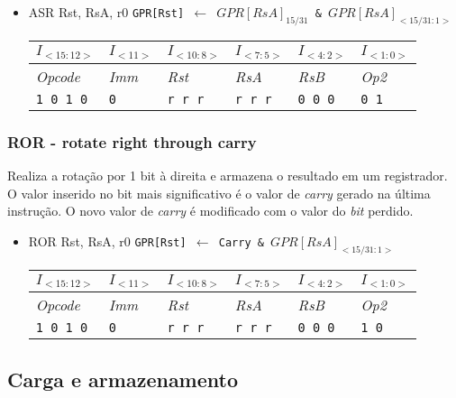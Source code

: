 \documentclass{extreport}
\begin{document}
\begin{itemize}
\item ASR Rst, RsA, r0
\subitem \texttt{GPR[Rst] $\leftarrow$ $GPR[RsA]_{15/31}$ \& $GPR[RsA]_{<15/31:1>}$}
\begin{table}[ht!]
\centering
\begin{tabular}{|p{1.6cm}|p{1.6cm}|p{1.6cm}|p{1.6cm}|p{1.6cm}|p{1.6cm}|}
\hline
$I_{<15:12>}$ & $I_{<11>}$ & $I_{<10:8>}$ & $I_{<7:5>}$ & $I_{<4:2>}$ & $I_{<1:0>}$ \\ \hline
\textit{Opcode} & \textit{Imm} & \textit{Rst} & \textit{RsA} & \textit{RsB} & \textit{Op2} \\ \hline
\texttt{1 0 1 0} & \texttt{0} & \texttt{r r r} & \texttt{r r r} & \texttt{0 0 0} & \texttt{0 1} \\ \hline
\end{tabular}
\end{table}
\end{itemize}

\subsubsection{ROR - rotate right through carry}
Realiza a rotação por 1 bit à direita e armazena o resultado em um registrador. O valor inserido no bit mais significativo é o valor de \textit{carry} gerado na última instrução. O novo valor de \textit{carry} é modificado com o valor do \textit{bit} perdido.

\begin{itemize}
\item ROR Rst, RsA, r0
\subitem \texttt{GPR[Rst] $\leftarrow$ Carry \& $GPR[RsA]_{<15/31:1>}$}
\begin{table}[ht!]
\centering
\begin{tabular}{|p{1.6cm}|p{1.6cm}|p{1.6cm}|p{1.6cm}|p{1.6cm}|p{1.6cm}|}
\hline
$I_{<15:12>}$ & $I_{<11>}$ & $I_{<10:8>}$ & $I_{<7:5>}$ & $I_{<4:2>}$ & $I_{<1:0>}$ \\ \hline
\textit{Opcode} & \textit{Imm} & \textit{Rst} & \textit{RsA} & \textit{RsB} & \textit{Op2} \\ \hline
\texttt{1 0 1 0} & \texttt{0} & \texttt{r r r} & \texttt{r r r} & \texttt{0 0 0} & \texttt{1 0} \\ \hline
\end{tabular}
\end{table}
\end{itemize}

\subsection{Carga e armazenamento}
\end{document}
